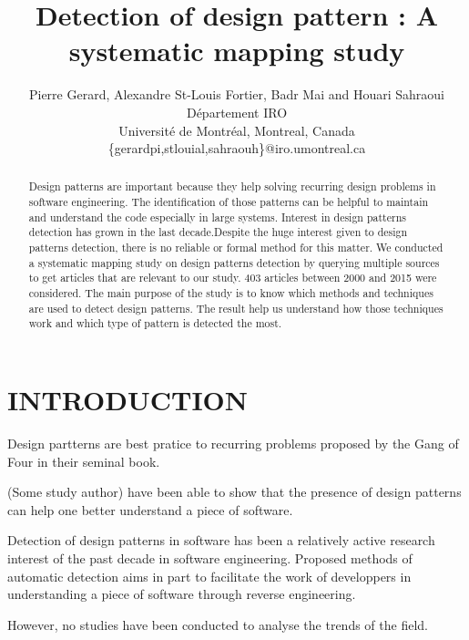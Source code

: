 \documentclass[letterpaper, 10 pt, conference]{ieeeconf}  %
\title{\LARGE \bf
Detection of design pattern : A systematic mapping study}
\author{Pierre Gerard, Alexandre St-Louis Fortier, Badr Mai and Houari Sahraoui \\
Département IRO \\
Université de Montréal, Montreal, Canada \\
\{gerardpi,stlouial,sahraouh\}@iro.umontreal.ca
}
\begin{document}
\maketitle
\thispagestyle{empty}
\pagestyle{empty}


\begin{abstract}

Design patterns are important because they help solving recurring design problems in software engineering. The identification of those patterns can be helpful to maintain and understand the code especially in large systems. Interest in design patterns detection has grown in the last decade.Despite the huge interest given to design patterns detection, there is no reliable or formal method for this matter.
We conducted a systematic mapping study on design patterns detection by querying multiple sources to get articles that are relevant to our study. 403 articles between 2000 and 2015 were considered.
The main purpose of the study is to know which methods and techniques are used to detect design patterns.
The result help us understand how those techniques work and which type of pattern is detected the most.



\end{abstract}


\section{INTRODUCTION}


Design partterns are best pratice to recurring problems proposed by the Gang
of Four in their seminal book.

(Some study author) have been able to show that the presence of design patterns
can help one better understand a piece of software.

Detection of design patterns in software has been a relatively active research
interest of the past decade in software engineering.
Proposed methods of automatic detection aims in part to facilitate the work of
developpers in understanding a piece of software through reverse engineering.

However, no studies have been conducted to analyse the trends of the field.

\end{document}

